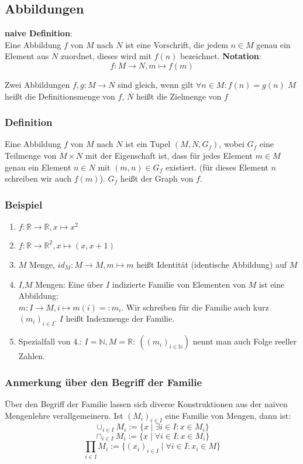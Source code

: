 \documentclass[a4paper]{scrartcl}
\DeclareMathOperator{\Forall}{\forall}
\theoremstyle{definition}
\theoremstyle{plain}
\theoremstyle{plain}
\theoremstyle{remark}
\theoremstyle{remark}
\theoremstyle{remark}
\theoremstyle{remark}
\theoremstyle{remark}
\begin{document}
\subsection{Abbildungen}
\label{sec-2-6}
\textbf{naive Definition}: \\
   Eine Abbildung $f$ von $M$ nach $N$ ist eine Vorschrift, die jedem $n\in M$ genau ein Element aus $N$ zuordnet, dieses wird mit $f(n)$ bezeichnet.
\textbf{Notation}: \\
   \[f:M\to N,m\mapsto f(m)\]

Zwei Abbildungen $f,g:M\to N$ sind gleich, wenn gilt $\Forall n\in M:f(n) = g(n)$
$M$ heißt die Definitionsmenge von $f$, $N$ heißt die Zielmenge von $f$
\subsubsection{Definition}
\label{sec-2-6-1}
Eine Abbildung $f$ von $M$ nach $N$ ist ein Tupel $(M,N,G_f)$, wobei $G_f$ eine Teilmenge von $M\times N$ mit der Eigenschaft ist, dass für jedes Element $m\in M$ genau ein Element $n\in N$ mit $(m,n) \in G_f$ existiert.
(für dieses Element $n$ schreiben wir auch $f(m)$). $G_f$ heißt der Graph von $f$.
\subsubsection{Beispiel}
\label{sec-2-6-2}
\begin{enumerate}
\item $f:\mathbb{R}\to\mathbb{R}, x\mapsto x^2$
\item $f:\mathbb{R}\to\mathbb{R}^2,x\mapsto (x,x+1)$
\item $M$ Menge, $id_M: M\to M,m\mapsto m$ heißt Identität (identische Abbildung) auf $M$
\item $I$,$M$ Mengen: Eine über $I$ indizierte Familie von Elementen von $M$ ist eine Abbildung: \\
           $m:I\to M,i\mapsto m(i) =: m_i$. Wir schreiben für die Familie auch kurz $(m_i)_{i\in I}$. $I$ heißt Indexmenge der Familie.
\item Spezialfall von 4.: $I = \mathbb{N},M = \mathbb{R}:~((m_i)_{i\in\mathbb{N}})$ nennt man auch Folge reeller Zahlen.
\end{enumerate}
\subsubsection{Anmerkung über den Begriff der Familie}
\label{sec-2-6-3}
Über den Begriff der Familie lassen sich diverse Konstruktionen aus der naiven Mengenlehre verallgemeinern.
Ist $(M_i)_{i\in I}$ eine Familie von Mengen, dann ist:
\[\cup_{i\in I} M_i:=\{x\mid\exists i\in I: x\in M_i\}\]
\[\cap_{i\in I}M_i := \{x\mid\Forall i\in I: x\in M_i\}\]
\[\prod_{i\in I}M_i := \{(x_i)_{i\in I}\mid \Forall i\in I: x_i \in M\}\]
\end{document}
